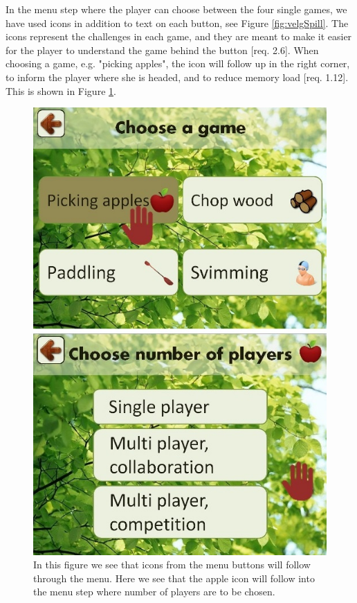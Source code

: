 In the menu step where the player can choose between the four single games, we have used icons in addition to text on each button, see Figure \ref{fig:velgSpill}. The icons represent the challenges in each game, and they are meant to make it easier for the player to understand the game behind the button [req. 2.6]. When choosing a game, e.g. "picking apples", the icon will follow up in the right corner, to inform the player where she is headed, and to reduce memory load [req. 1.12]. This is shown in Figure \ref{fig:iconEple}.  

\begin{figure} [H]
\centering
\includegraphics[scale=0.5]{menuIconApple.jpg}
\caption[Menu - use of icons]{In this figure we see that icons from the menu buttons will follow through the menu. Here we see that the apple icon will follow into the menu step where number of players are to be chosen.}
\label{fig:iconEple}
\end{figure} 
     
